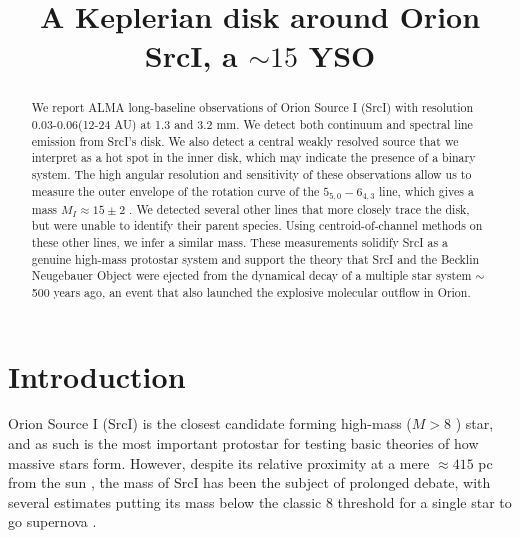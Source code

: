 \documentclass[twocolumn]{aastex61}
\newcommand{\sourcei}{SrcI\xspace}
\begin{document}


\title{A Keplerian disk around Orion \sourcei, a $\sim15$ \msun YSO}
\begin{abstract}
   We report ALMA long-baseline observations of Orion Source I (\sourcei) with resolution
   0.03-0.06\arcsec (12-24 AU) at 1.3 and 3.2 mm.
   We detect both continuum and spectral line emission from \sourcei's disk.
   We also detect a central weakly resolved source that we interpret as a hot spot
   in the inner disk, which may indicate the presence of a binary system.
   The high angular resolution and sensitivity of these observations allow us
   to measure the outer envelope of the rotation curve of the \water
   $5_{5,0}-6_{4,3}$ line, which gives a mass $M_I\approx15\pm2$ \msun.
   We detected several other lines that more closely trace the disk, but were
   unable to identify their parent species.  Using centroid-of-channel methods
   on these other lines, we infer a similar mass.
   These measurements solidify \sourcei as a genuine high-mass protostar system
   and support the theory that \sourcei and the Becklin Neugebauer Object were
   ejected from the dynamical decay of a multiple star system $\sim$500 years
   ago, an event that also launched the explosive molecular outflow in Orion.
\end{abstract}

\section{Introduction}
Orion Source I (\sourcei) is the closest candidate forming high-mass ($M>8$ \msun) star, 
and as such is the most important protostar for testing basic theories
of how massive stars form.  However, despite its relative proximity at
a mere $\approx415$ pc from the sun \citep{Menten2007a,Kim2008a}, the mass of \sourcei
has been the subject of prolonged debate, with several estimates
putting
its mass below the classic 8 \msun threshold for a single star to go supernova
\citep[][]{Heger2003}.
\end{document}
